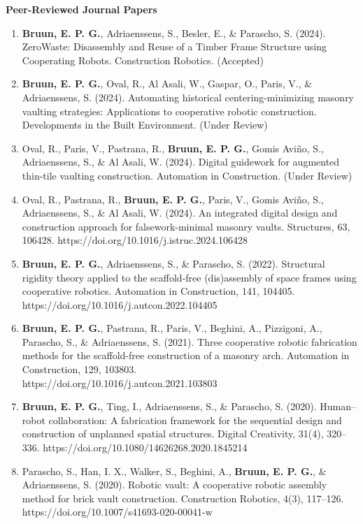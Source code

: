     \vspace{0.5cm}
    \noindent\textbf{Peer-Reviewed Journal Papers}
    \begin{enumerate} [topsep=0pt]
        \item \textbf{Bruun, E. P. G.}, Adriaenssens, S., Besler, E., \& Parascho, S. (2024). ZeroWaste: Disassembly and Reuse of a Timber Frame Structure using Cooperating Robots. Construction Robotics. (Accepted)
        \item \textbf{Bruun, E. P. G.}, Oval, R., Al Asali, W., Gaspar, O., Paris, V., \& Adriaenssens, S. (2024). Automating historical centering-minimizing masonry vaulting strategies: Applications to cooperative robotic construction. Developments in the Built Environment. (Under Review)

        \item Oval, R., Paris, V., Pastrana, R., \textbf{Bruun, E. P. G.}, Gomis Aviño, S., Adriaenssens, S., \& Al Asali, W. (2024). Digital guidework for augmented thin-tile vaulting construction. Automation in Construction. (Under Review)

        \item Oval, R., Pastrana, R., \textbf{Bruun, E. P. G.}, Paris, V., Gomis Aviño, S., Adriaenssens, S., \& Al Asali, W. (2024). An integrated digital design and construction approach for falsework-minimal masonry vaults. Structures, 63, 106428. https://doi.org/10.1016/j.istruc.2024.106428
        \item \textbf{Bruun, E. P. G.}, Adriaenssens, S., \& Parascho, S. (2022). Structural rigidity theory applied to the scaffold-free (dis)assembly of space frames using cooperative robotics. Automation in Construction, 141, 104405. https://doi.org/10.1016/j.autcon.2022.104405
        \item \textbf{Bruun, E. P. G.}, Pastrana, R., Paris, V., Beghini, A., Pizzigoni, A., Parascho, S., \& Adriaenssens, S. (2021). Three cooperative robotic fabrication methods for the scaffold-free construction of a masonry arch. Automation in Construction, 129, 103803. \\ https://doi.org/10.1016/j.autcon.2021.103803
        \item \textbf{Bruun, E. P. G.}, Ting, I., Adriaenssens, S., \& Parascho, S. (2020). Human–robot collaboration: A fabrication framework for the sequential design and construction of unplanned spatial structures. Digital Creativity, 31(4), 320–336. https://doi.org/10.1080/14626268.2020.1845214
        \item Parascho, S., Han, I. X., Walker, S., Beghini, A., \textbf{Bruun, E. P. G.}, \& Adriaenssens, S. (2020). Robotic vault: A cooperative robotic assembly method for brick vault construction. Construction Robotics, 4(3), 117–126. https://doi.org/10.1007/s41693-020-00041-w
    \end{enumerate}
    
